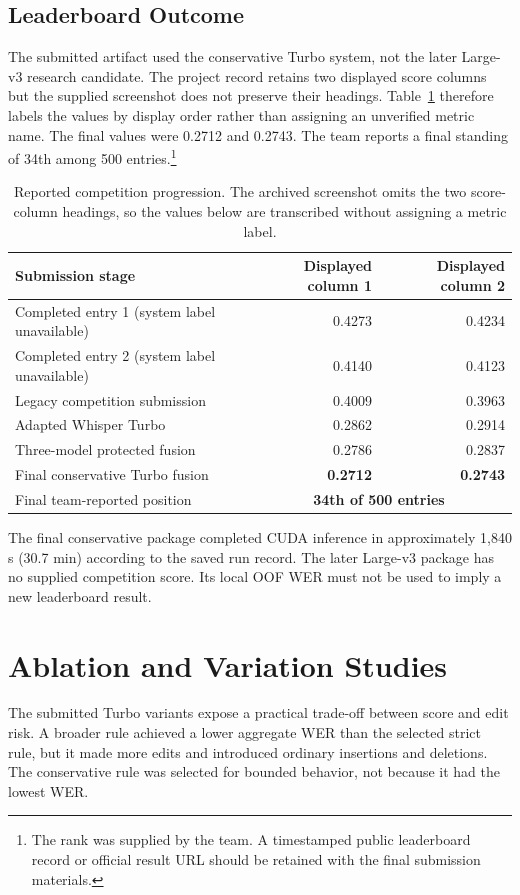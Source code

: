 \documentclass[journal]{IEEEtran}
\begin{document}
\subsection{Leaderboard Outcome}
The submitted artifact used the conservative Turbo system, not the later Large-v3 research candidate. The project record retains two displayed score columns but the supplied screenshot does not preserve their headings. Table~\ref{tab:leaderboard} therefore labels the values by display order rather than assigning an unverified metric name. The final values were 0.2712 and 0.2743. The team reports a final standing of 34th among 500 entries.\footnote{The rank was supplied by the team. A timestamped public leaderboard record or official result URL should be retained with the final submission materials.}

\begin{table}[!t]
\caption{Reported competition progression. The archived screenshot omits the two score-column headings, so the values below are transcribed without assigning a metric label.}
\label{tab:leaderboard}
\centering
\footnotesize
\begin{tabular}{lrr}
\toprule
Submission stage & Displayed column 1 & Displayed column 2 \\
\midrule
Completed entry 1 (system label unavailable) & 0.4273 & 0.4234 \\
Completed entry 2 (system label unavailable) & 0.4140 & 0.4123 \\
Legacy competition submission & 0.4009 & 0.3963 \\
Adapted Whisper Turbo & 0.2862 & 0.2914 \\
Three-model protected fusion & 0.2786 & 0.2837 \\
Final conservative Turbo fusion & \textbf{0.2712} & \textbf{0.2743} \\
\midrule
Final team-reported position & \multicolumn{2}{c}{\textbf{34th of 500 entries}} \\
\bottomrule
\end{tabular}
\end{table}

The final conservative package completed CUDA inference in approximately 1,840 s (30.7 min) according to the saved run record. The later Large-v3 package has no supplied competition score. Its local OOF WER must not be used to imply a new leaderboard result.

\section{Ablation and Variation Studies}
The submitted Turbo variants expose a practical trade-off between score and edit risk. A broader rule achieved a lower aggregate WER than the selected strict rule, but it made more edits and introduced ordinary insertions and deletions. The conservative rule was selected for bounded behavior, not because it had the lowest WER.
\end{document}

